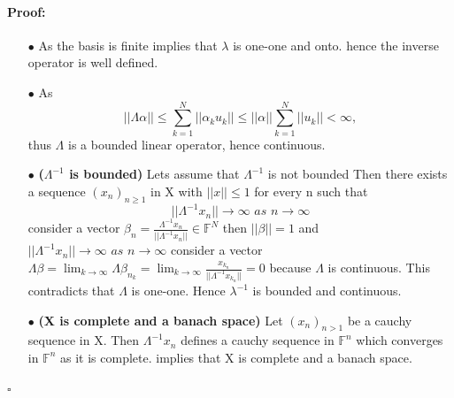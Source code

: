 \documentclass{article}
\newenvironment{proof}{\paragraph{Proof:}}{\hfill$\square$}
\begin{document}
\begin{proof}
    \begin{enumerate}
        \item[$\bullet $ ] As the basis is finite implies that $\lambda$ is one-one and onto. hence the inverse operator is well defined.
        \item[$\bullet $] As $$||\Lambda \alpha||\leq \sum_{k=1}^{N} ||\alpha_k u_k|| \leq ||\alpha || \sum_{k=1}^{N} ||u_k||< \infty, $$
          thus $\Lambda $ is a bounded linear operator, hence continuous. 
        \item [$\bullet$] \textbf{($\Lambda^{-1}$ is bounded)} Lets assume that $\Lambda^{-1}$ is not bounded Then there exists a sequence $(x_n)_{n\geq1}$ in X with $||x||\leq 1$ for every n such that $$||\Lambda^{-1} x_n||\longrightarrow \infty \textit{  as  } n\longrightarrow \infty$$
      consider a vector $\beta_n = \frac{\Lambda^{-1}x_n}{||\Lambda^{-1}x_n||} \in \mathbb{F}^N$
      then $||\beta ||=1$ and   $||\Lambda^{-1} x_n||\longrightarrow \infty \textit{  as  } n\longrightarrow \infty$$
     $ consider a vector 
      $\Lambda \beta = \lim_{k \to \infty} \Lambda \beta_{n_k} = \lim_{k \to \infty } \frac{x_{k_n}}{||\Lambda^{-1}x_{k_n}||} =0$ because $\Lambda$ is continuous. This contradicts that $\Lambda$ is one-one. 
      Hence $\lambda^{-1}$ is bounded and continuous.
      \item[$\bullet$] \textbf{(X is complete and a banach space)} Let $(x_n)_{n>1}$ be a cauchy sequence in X. Then $\Lambda^{-1} x_n $ defines a cauchy sequence in $\mathbb{F}^n$ which converges in $\mathbb{F}^n$ as it is complete. implies that X is complete and a banach space.   
    \end{enumerate}
\end{proof}
\end{document}
